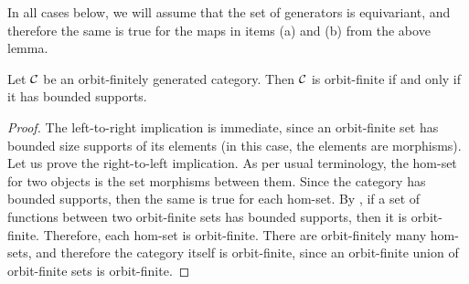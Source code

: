 In all cases below, we will assume that the set of generators is equivariant, and therefore the same is true for the maps in items (a) and (b) from the above lemma. 


\begin{lemma}\label{lem:bounded-supports}
    Let ${\mathcal C}$ be an orbit-finitely generated category. Then ${\mathcal C}$ is orbit-finite if and only if it has bounded supports.  
\end{lemma}
\begin{proof}
    The left-to-right implication is immediate, since an orbit-finite set has bounded size supports of its elements (in this case, the elements are morphisms). Let us prove the right-to-left implication. 
    As per usual terminology, the hom-set for two objects is the set morphisms between them. Since the category has bounded supports, then the same is true for each hom-set. By \cite[Lemma 15]{bojanczyk_stefanski2019}, if a set of functions between two orbit-finite sets has bounded supports, then it is orbit-finite. Therefore, each hom-set is orbit-finite. There are orbit-finitely many hom-sets, and therefore the category itself is orbit-finite, since an orbit-finite union of orbit-finite sets is orbit-finite.
\end{proof}

